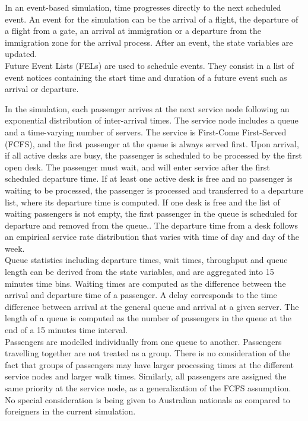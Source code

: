 \documentclass[11pt,onecolumn]{IEEEtran}
\begin{document}
In an event-based simulation, time progresses directly to the next scheduled event.
An event for the simulation can be the arrival of a flight, the departure of a flight from a gate, an arrival at immigration or a departure from the immigration zone for the arrival process. After an event, the state variables are updated.\\
Future Event Lists (FELs) \cite{Birta2007Simulation} are used to schedule events. They consist in a list of event notices containing the start time and duration of a future event such as arrival or departure. 

In the simulation, each passenger arrives at the next service node following an exponential distribution of inter-arrival times. The service node includes a queue and a time-varying number of servers. The service is First-Come First-Served (FCFS), and the first passenger at the queue is always served first.
Upon arrival, if all active desks are busy, the passenger is scheduled to be processed by the first open desk. The passenger must wait, and will enter service after the first scheduled departure time.
If at least one active desk is free and no passenger is waiting to be processed, the passenger is processed and transferred to a departure list, where its departure time is computed.
If one desk is free and the list of waiting passengers is not empty, the first passenger in the queue is scheduled for departure and removed from the queue.. 
The departure time from a desk follows an empirical service rate distribution that varies with time of day and day of the week.  \\
Queue statistics including departure times, wait times, throughput and queue length  can be derived from the state variables, and are aggregated into 15 minutes time bins. 
Waiting times are  computed as the difference between the arrival and departure time of a passenger. A delay corresponds to the time difference between arrival at the general queue and arrival at a given server. The length of a queue is computed as the number of passengers in the queue at the end of a 15 minutes time interval.\\
Passengers are modelled individually from one queue to another.
Passengers travelling together are not treated as a group. There is no consideration of the fact that groups of passengers may have larger processing times at the different service nodes and larger walk times.
Similarly, all passengers are assigned the same priority at the service node, as a generalization of the FCFS assumption. No special consideration is being given to Australian nationals as compared to foreigners in the current simulation.
\end{document}
